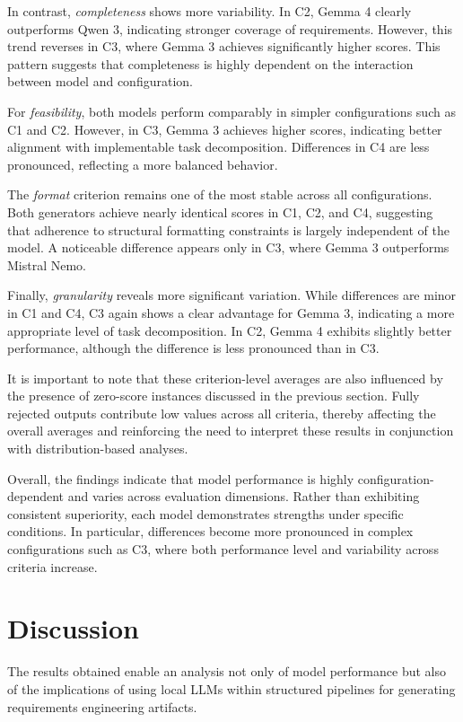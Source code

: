 \documentclass[pdflatex,sn-mathphys-num]{sn-jnl}%
\theoremstyle{thmstyleone}%
\theoremstyle{thmstyletwo}%
\theoremstyle{thmstylethree}%
\begin{document}
In contrast, \textit{completeness} shows more variability. In C2, Gemma 4 clearly outperforms Qwen 3, indicating stronger coverage of requirements. However, this trend reverses in C3, where Gemma 3 achieves significantly higher scores. This pattern suggests that completeness is highly dependent on the interaction between model and configuration.

For \textit{feasibility}, both models perform comparably in simpler configurations such as C1 and C2. However, in C3, Gemma 3 achieves higher scores, indicating better alignment with implementable task decomposition. Differences in C4 are less pronounced, reflecting a more balanced behavior.

The \textit{format} criterion remains one of the most stable across all configurations. Both generators achieve nearly identical scores in C1, C2, and C4, suggesting that adherence to structural formatting constraints is largely independent of the model. A noticeable difference appears only in C3, where Gemma 3 outperforms Mistral Nemo.

Finally, \textit{granularity} reveals more significant variation. While differences are minor in C1 and C4, C3 again shows a clear advantage for Gemma 3, indicating a more appropriate level of task decomposition. In C2, Gemma 4 exhibits slightly better performance, although the difference is less pronounced than in C3.

It is important to note that these criterion-level averages are also influenced by the presence of zero-score instances discussed in the previous section. Fully rejected outputs contribute low values across all criteria, thereby affecting the overall averages and reinforcing the need to interpret these results in conjunction with distribution-based analyses.

Overall, the findings indicate that model performance is highly configuration-dependent and varies across evaluation dimensions. Rather than exhibiting consistent superiority, each model demonstrates strengths under specific conditions. In particular, differences become more pronounced in complex configurations such as C3, where both performance level and variability across criteria increase.

\section{Discussion}\label{sec5}

The results obtained enable an analysis not only of model performance but also of the implications of using local LLMs within structured pipelines for generating requirements engineering artifacts.
\end{document}
